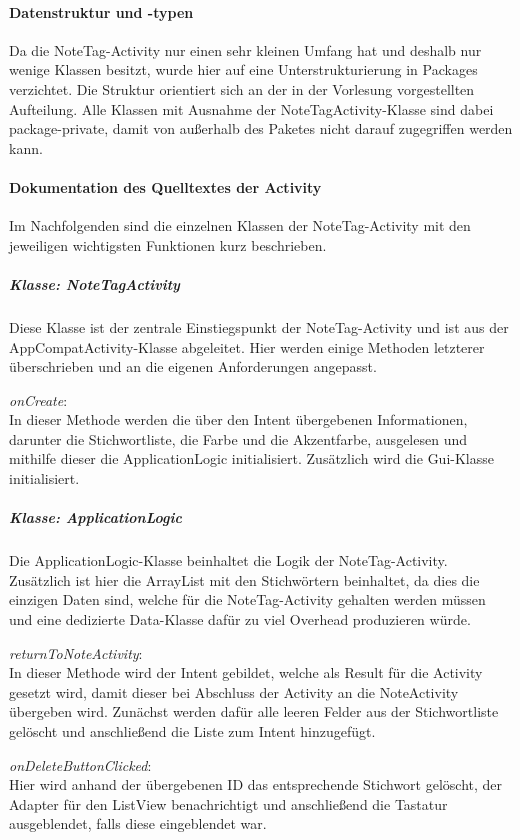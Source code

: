 \paragraph{Datenstruktur und -typen}
Da die NoteTag-Activity nur einen sehr kleinen Umfang hat und deshalb nur wenige Klassen besitzt, wurde hier auf eine Unterstrukturierung in Packages verzichtet. Die Struktur orientiert sich an der in der Vorlesung vorgestellten Aufteilung. Alle Klassen mit Ausnahme der NoteTagActivity-Klasse sind dabei package-private, damit von außerhalb des Paketes nicht darauf zugegriffen werden kann.

\paragraph{Dokumentation des Quelltextes der Activity}
Im Nachfolgenden sind die einzelnen Klassen der NoteTag-Activity mit den jeweiligen wichtigsten Funktionen kurz beschrieben.

\subparagraph{Klasse: NoteTagActivity}
Diese Klasse ist der zentrale Einstiegspunkt der NoteTag-Activity und ist aus der AppCompatActivity-Klasse abgeleitet. Hier werden einige Methoden letzterer überschrieben und an die eigenen Anforderungen angepasst.

\textit{onCreate}:\\
In dieser Methode werden die über den Intent übergebenen Informationen, darunter die Stichwortliste, die Farbe und die Akzentfarbe, ausgelesen und mithilfe dieser die ApplicationLogic initialisiert. Zusätzlich wird die Gui-Klasse initialisiert.

\subparagraph{Klasse: ApplicationLogic}
Die ApplicationLogic-Klasse beinhaltet die Logik der NoteTag-Activity. Zusätzlich ist hier die ArrayList mit den Stichwörtern beinhaltet, da dies die einzigen Daten sind, welche für die NoteTag-Activity gehalten werden müssen und eine dedizierte Data-Klasse dafür zu viel Overhead produzieren würde.

\textit{returnToNoteActivity}:\\
In dieser Methode wird der Intent gebildet, welche als Result für die Activity gesetzt wird, damit dieser bei Abschluss der Activity an die NoteActivity übergeben wird. Zunächst werden dafür alle leeren Felder aus der Stichwortliste gelöscht und anschließend die Liste zum Intent hinzugefügt.

\textit{onDeleteButtonClicked}:\\
Hier wird anhand der übergebenen ID das entsprechende Stichwort gelöscht, der Adapter für den ListView benachrichtigt und anschließend die Tastatur ausgeblendet, falls diese eingeblendet war.

